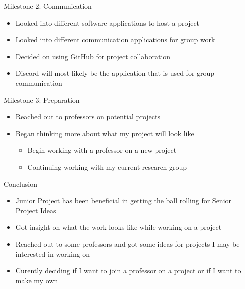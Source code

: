 \documentclass[10pt]{beamer}
\begin{document}
\begin{frame}[fragile]{Milestone 2: Communication}
  \begin{itemize}
    \item Looked into different software applications to host a project
    \item Looked into different communication applications for group work
    \item Decided on using GitHub for project collaboration
    \item Discord will most likely be the application that is used for group communication
  \end{itemize}
\end{frame}

\begin{frame}[fragile]{Milestone 3: Preparation}
  \begin{itemize}
    \item Reached out to professors on potential projects
    \item Began thinking more about what my project will look like
      \begin{itemize}
        \item Begin working with a professor on a new project
        \item Continuing working with my current research group
      \end{itemize}
  \end{itemize}
\end{frame}

\begin{frame}[fragile]{Conclusion}
  \begin{itemize}
    \item Junior Project has been beneficial in getting the ball rolling for Senior Project Ideas
    \item Got insight on what the work looks like while working on a project
    \item Reached out to some professors and got some ideas for projects I may be interested in working on
    \item Curently deciding if I want to join a professor on a project or if I want to make my own
  \end{itemize}
\end{frame}
\end{document}

